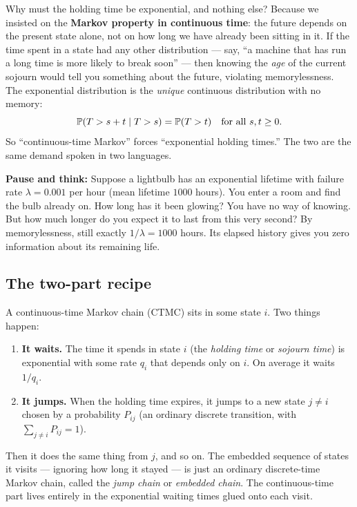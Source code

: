 \begin{whybox}
Why must the holding time be exponential, and nothing else? Because we insisted on the
\textbf{Markov property in continuous time}: the future depends on the present state alone, not on
how long we have already been sitting in it. If the time spent in a state had any other distribution
--- say, ``a machine that has run a long time is more likely to break soon'' --- then knowing the
\emph{age} of the current sojourn would tell you something about the future, violating
memorylessness. The exponential distribution is the \emph{unique} continuous distribution with no
memory:
\[
  \operatorname{\mathbb{P}}(T > s + t \mid T > s) = \operatorname{\mathbb{P}}(T > t)
  \quad\text{for all } s, t \ge 0.
\]
So ``continuous-time Markov'' forces ``exponential holding times.'' The two are the same demand
spoken in two languages.
\end{whybox}

\begin{recoverybox}
\textbf{Pause and think:} Suppose a lightbulb has an exponential lifetime with failure rate
$\lambda = 0.001$ per hour (mean lifetime $1000$ hours). You enter a room and find the bulb already
on. How long has it been glowing? You have no way of knowing. But how much longer do you expect it
to last from this very second? By memorylessness, still exactly $1/\lambda = 1000$ hours. Its elapsed
history gives you zero information about its remaining life.
\end{recoverybox}

\subsection{The two-part recipe}

A continuous-time Markov chain (CTMC) sits in some state $i$. Two things happen:

\begin{enumerate}
  \item \textbf{It waits.} The time it spends in state $i$ (the \emph{holding time} or
  \emph{sojourn time}) is exponential with some rate $q_i$ that depends only on $i$. On average it
  waits $1/q_i$.
  \item \textbf{It jumps.} When the holding time expires, it jumps to a new state $j \ne i$ chosen
  by a probability $P_{ij}$ (an ordinary discrete transition, with $\sum_{j \ne i} P_{ij} = 1$).
\end{enumerate}

Then it does the same thing from $j$, and so on. The embedded sequence of states it visits ---
ignoring how long it stayed --- is just an ordinary discrete-time Markov chain, called the
\emph{jump chain} or \emph{embedded chain}. The continuous-time part lives entirely in the
exponential waiting times glued onto each visit.

